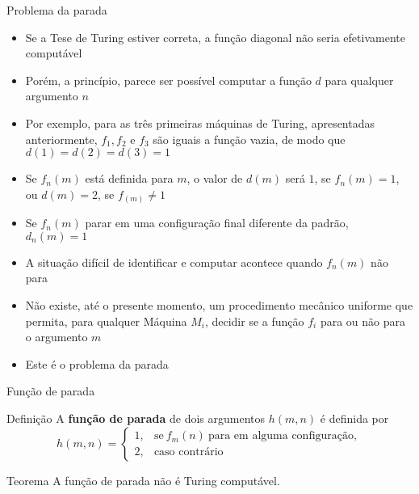 \begin{frame}[fragile]{Problema da parada}

    \begin{itemize}
        \item Se a Tese de Turing estiver correta, a função diagonal não seria efetivamente 
            computável

        \item Porém, a princípio, parece ser possível computar a função $d$ para qualquer
            argumento $n$

        \item Por exemplo, para as três primeiras máquinas de Turing, apresentadas anteriormente,
            $f_1, f_2$ e $f_3$ são iguais a função vazia, de modo que $d(1) = d(2) = d(3) = 1$

        \item Se $f_n(m)$ está definida para $m$, o valor de $d(m)$ será $1$, se $f_n(m) = 1$, ou
            $d(m) = 2$, se $f_(m) \neq 1$

        \item Se $f_n(m)$ parar em uma configuração final diferente da padrão, $d_n(m) = 1$

        \item A situação difícil de identificar e computar acontece quando $f_n(m)$ não para

        \item Não existe, até o presente momento, um procedimento mecânico uniforme que permita,
            para qualquer Máquina $M_i$, decidir se a função $f_i$ para ou não para o argumento
        $m$

        \item Este é o problema da parada
    \end{itemize}

\end{frame}

\begin{frame}[fragile]{Função de parada}

    \begin{block}{Definição}
        A \textbf{função de parada} de dois argumentos $h(m, n)$ é definida por
        \[
            h(m, n) = \left\lbrace \begin{array}{ll}
                1,& \mbox{se}\ f_m(n)\ \mbox{para em alguma configuração}, \\
                2,& \mbox{caso contrário}
            \end{array}\right.
        \]
    \end{block}

    \vspace{0.2in}

    \begin{block}{Teorema}
        A função de parada não é Turing computável.
    \end{block}

\end{frame}
